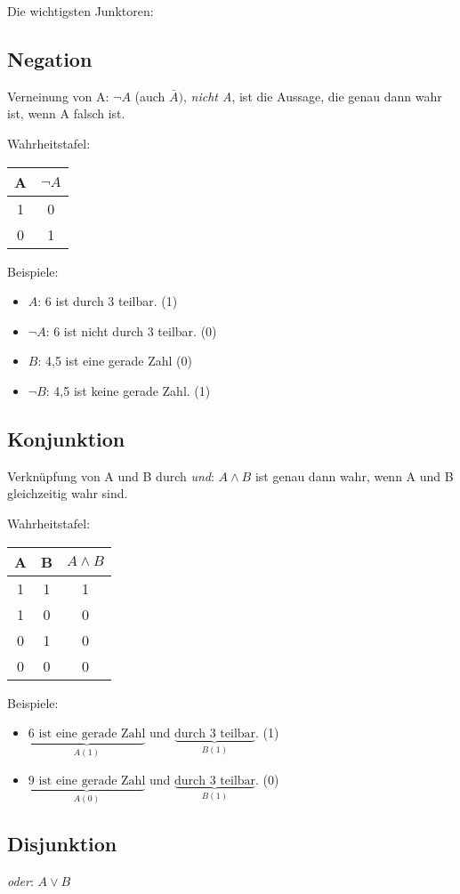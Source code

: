 \documentclass[a4paper, 12pt, twoside] {article}
\begin{document}
Die wichtigsten Junktoren:

\subsection{Negation} %
Verneinung von A: $\neg A$ (auch $\bar{A})$, \textit{nicht A}, ist die Aussage, die genau dann wahr ist, wenn A falsch ist.

Wahrheitstafel: \qquad
\begin{tabular}{| c | c |}
\hline
A & $\neg A$ \\
\hline
1 & 0 \\
0 & 1 \\
\hline
\end{tabular}

Beispiele: 
\begin{itemize}
\item $A$: 6 ist durch 3 teilbar. (1)
\item $\neg A $: 6 ist nicht durch 3 teilbar. (0)
\item $B$: 4,5 ist eine gerade Zahl (0)
\item $\neg B$: 4,5 ist keine gerade Zahl. (1)
\end{itemize}

\subsection{Konjunktion} %
Verknüpfung von A und B durch \textit{und}: $A \wedge B$ ist genau dann wahr, wenn A und B gleichzeitig wahr sind.

Wahrheitstafel: \qquad
\begin{tabular}{| c c | c |}
\hline
A & B & $A \wedge B$ \\
\hline
1 & 1 & 1 \\
1 & 0 & 0 \\
0 & 1 & 0 \\
0 & 0 & 0 \\
\hline
\end{tabular}

Beispiele:
\begin{itemize}
\item $\underbrace{\text{6 ist eine gerade Zahl}}_{A (1)}$ und $\underbrace{\text{durch 3 teilbar}}_{B (1)}$. (1)
\item $\underbrace{\text{9 ist eine gerade Zahl}}_{A (0)}$ und $\underbrace{\text{durch 3 teilbar}}_{B (1)}$. (0)
\end{itemize}

\subsection{Disjunktion} %
\textit{oder}: $A \lor B$
\end{document}
